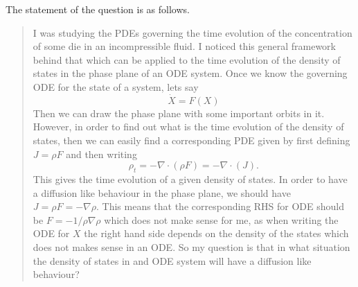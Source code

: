 \begin{observation}
	The statement of the question is as follows.
	\begin{quote}
		I was studying the PDEs governing the time evolution of the concentration of some die in an incompressible fluid. I noticed this general framework behind that which can be applied to the time evolution of the density of states in the phase plane of an ODE system. Once we know the governing ODE for the state of a system, lets say
		\[ \dot{X}  = F(X) \] 
		Then we can draw the phase plane with some important orbits in it. However, in order to find out what is the time evolution of the density of states, then we can easily find a corresponding PDE given by first defining $  J = \rho F$ and then writing
		\[ \rho_t = -\nabla\cdot(\rho F) = -\nabla\cdot(J). \]
		This gives the time evolution of a given density of states. In order to have a diffusion like behaviour in the phase plane, we should have $  J = \rho F = -\nabla \rho$. This means that the corresponding RHS for ODE should be $ F = -1/\rho \nabla \rho $ which does not make sense for me, as when writing the ODE for $ X $ the right hand side depends on the density of the states which does not makes sense in an ODE. So my question is that in what situation the density of states in and ODE system will have a diffusion like behaviour?
	\end{quote}
	

\end{observation}
